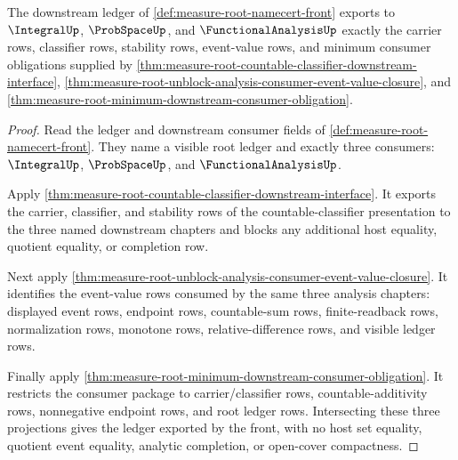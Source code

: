 \begin{theorem}
\label{thm:measure-root-namecert-front-ledger}
The downstream ledger of \autoref{def:measure-root-namecert-front} exports to
$\IntegralUp$, $\ProbSpaceUp$, and $\FunctionalAnalysisUp$ exactly the
carrier rows, classifier rows, stability rows, event-value rows, and minimum
consumer obligations supplied by
\autoref{thm:measure-root-countable-classifier-downstream-interface},
\autoref{thm:measure-root-unblock-analysis-consumer-event-value-closure},
and \autoref{thm:measure-root-minimum-downstream-consumer-obligation}.
\end{theorem}
\begin{proof}
Read the ledger and downstream consumer fields of
\autoref{def:measure-root-namecert-front}. They name a visible root ledger
and exactly three consumers: $\IntegralUp$, $\ProbSpaceUp$, and
$\FunctionalAnalysisUp$.

Apply \autoref{thm:measure-root-countable-classifier-downstream-interface}.
It exports the carrier, classifier, and stability rows of the
countable-classifier presentation to the three named downstream chapters and
blocks any additional host equality, quotient equality, or completion row.

Next apply
\autoref{thm:measure-root-unblock-analysis-consumer-event-value-closure}.
It identifies the event-value rows consumed by the same three analysis
chapters: displayed event rows, endpoint rows, countable-sum rows,
finite-readback rows, normalization rows, monotone rows,
relative-difference rows, and visible ledger rows.

Finally apply
\autoref{thm:measure-root-minimum-downstream-consumer-obligation}. It
restricts the consumer package to carrier/classifier rows,
countable-additivity rows, nonnegative endpoint rows, and root ledger rows.
Intersecting these three projections gives the ledger exported by the front,
with no host set equality, quotient event equality, analytic completion, or
open-cover compactness.
\end{proof}

